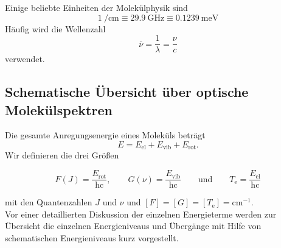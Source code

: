 	Einige beliebte Einheiten der Molekülphysik sind
	$$
	\SI{1}{ \per \centi \meter } \equiv \SI{29,9}{ \giga \hertz} \equiv \SI{0,1239}{\milli \electronvolt}
	$$
	Häufig wird die Wellenzahl
	$$
	\overline{ \nu} = \frac{1}{ \lambda} = \frac{ \nu}{c}
	$$ 
	verwendet.

\subsection{Schematische Übersicht über optische Molekülspektren}
	Die gesamte Anregungsenergie eines Moleküls beträgt
	\begin{equation}
		\label{eq:4.9}
		E = E_{\text{el}} + E_{\text{vib}} + E_{\text{rot}}.
	\end{equation}
	Wir definieren die drei Größen 
	\begin{definition}{}
		\centering
		\begin{equation*}
			F(J) = \frac{E_{\text{rot}}}{\mathrm{h} \mathrm{c}}, \qquad 
			G( \nu) = \frac{E_{\text{vib}}}{\mathrm{h} \mathrm{c}} \qquad\text{und}\qquad 
			T_{\mathrm{e}} = \frac{E_{\text{el}}}{\mathrm{h} \mathrm{c}}
		\end{equation*}
	\end{definition}
	mit den Quantenzahlen $J$ und $ \nu$ und $[F]=[G]=[T_\mathrm e] = \mathrm{cm}^{-1}$.\\

	Vor einer detaillierten Diskussion der einzelnen Energieterme werden zur Übersicht die einzelnen Energieniveaus und Übergänge mit Hilfe von schematischen Energieniveaus kurz vorgestellt.

